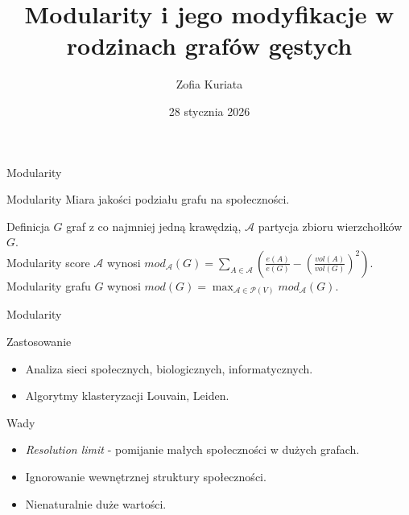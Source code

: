 \documentclass{beamer}
\title{Modularity i jego modyfikacje w rodzinach grafów gęstych}
\author{Zofia Kuriata}
\institute{Politechnika Wrocławska}
\date{28 stycznia 2026}
\begin{document}
\begin{frame}
    \titlepage
\end{frame}

\begin{frame}{Modularity}
    \begin{block}{Modularity}
        Miara jakości podziału grafu na społeczności.
    \end{block}
    \vspace{0.5cm}
    \begin{block}{Definicja}
        \(G\) graf z co najmniej jedną krawędzią, \(\mathcal{A}\) partycja zbioru wierzchołków \(G\).\\
        \vspace{0.4cm}
        Modularity score \(\mathcal{A}\) wynosi \(mod_{\mathcal{A}}(G) = \sum_{A \in \mathcal{A}} \left(\frac{e(A)}{e(G)} - {\left(\frac{vol(A)}{vol(G)}\right)}^2\right).\)\\
        \vspace{0.4cm}
        Modularity grafu \(G\) wynosi \(mod(G) = \max_{\mathcal{A} \in \mathcal{P}(V)} mod_{\mathcal{A}}(G).\)
    \end{block}

\end{frame}

\begin{frame}{Modularity}
    \begin{block}{Zastosowanie}
        \begin{itemize}
            \item Analiza sieci społecznych, biologicznych, informatycznych.
            \item Algorytmy klasteryzacji Louvain, Leiden.\\
        \end{itemize}

    \end{block}
    \vspace{0.2cm}
    \begin{block}{Wady}
        \begin{itemize}
            \item \textit{Resolution limit} - pomijanie małych społeczności w dużych grafach.
            \item Ignorowanie wewnętrznej struktury społeczności.
            \item Nienaturalnie duże wartości.\\
        \end{itemize}
    \end{block}
\end{frame}
\end{document}
